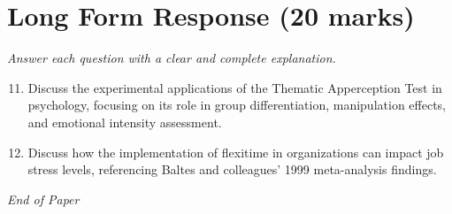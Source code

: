 \documentclass[12pt]{article}
\begin{document}
\section*{Long Form Response (20 marks)}
\textit{Answer each question with a clear and complete explanation.}
\begin{enumerate}[label=\arabic*.]
\setcounter{enumi}{10}
\item Discuss the experimental applications of the Thematic Apperception Test in psychology, focusing on its role in group differentiation, manipulation effects, and emotional intensity assessment.
\item Discuss how the implementation of flexitime in organizations can impact job stress levels, referencing Baltes and colleagues' 1999 meta-analysis findings.
\end{enumerate}

\vfill
\noindent\textit{End of Paper}
\end{document}
